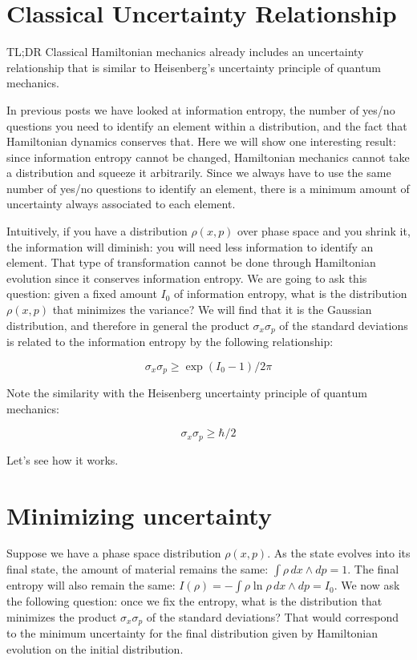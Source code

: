 \documentclass[aps,pra,10pt,floatfix,nofootinbib]{revtex4-1}
\theoremstyle{definition}
\begin{document}
	
\section{Classical Uncertainty Relationship}

TL;DR Classical Hamiltonian mechanics already includes an uncertainty relationship that is similar to Heisenberg's uncertainty principle of quantum mechanics.

In previous posts we have looked at information entropy, the number of yes/no questions you need to identify an element within a distribution, and the fact that Hamiltonian dynamics conserves that. Here we will show one interesting result: since information entropy cannot be changed, Hamiltonian mechanics cannot take a distribution and squeeze it arbitrarily. Since we always have to use the same number of yes/no questions to identify an element, there is a minimum amount of uncertainty always associated to each element.

Intuitively, if you have a distribution $\rho(x,p)$ over phase space and you shrink it, the information will diminish: you will need less information to identify an element. That type of transformation cannot be done through Hamiltonian evolution since it conserves information entropy. We are going to ask this question: given a fixed amount $I_0$ of information entropy, what is the distribution $\rho(x,p)$ that minimizes the variance? We will find that it is the Gaussian distribution, and therefore in general the product $\sigma_x\sigma_p$ of the standard deviations is related to the information entropy by the following relationship:

\begin{equation}
\sigma_x\sigma_p \geq \exp (I_0 - 1) / 2 \pi 
\label{classicalUncertainty}
\end{equation}

Note the similarity with the Heisenberg uncertainty principle of quantum mechanics:

\begin{equation}
\sigma_x\sigma_p \geq \hbar / 2
\label{quantumUncertainty}
\end{equation}

Let's see how it works.

\section{Minimizing uncertainty}

Suppose we have a phase space distribution $\rho(x,p)$. As the state evolves into its final state, the amount of material remains the same: $\int \rho \, dx \wedge dp = 1$. The final entropy will also remain the same: $I(\rho) = - \int \rho \ln \rho \, dx \wedge dp = I_0$. We now ask the following question: once we fix the entropy, what is the distribution that minimizes the product $\sigma_x\sigma_p$ of the standard deviations? That would correspond to the minimum uncertainty for the final distribution given by Hamiltonian evolution on the initial distribution.
\end{document}
